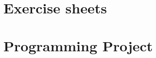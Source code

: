 \section{Exercise sheets}
\blatt

\blatt

\blatt

\blatt

\blatt

\blatt

\blatt

\blatt

\blatt

\blatt

\newpage
\section{Programming Project}


